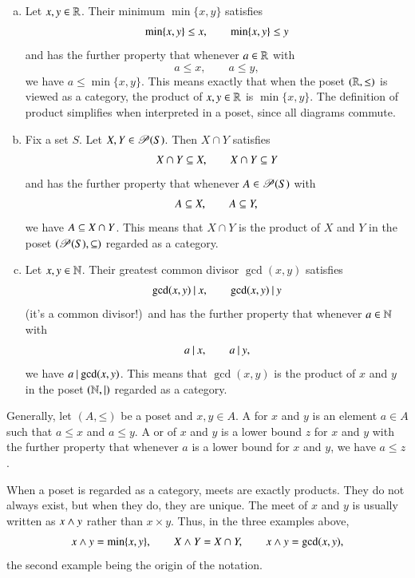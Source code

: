 \begin{examples}
\label{eg:prod-order}
%
%
\begin{enumerate}[(b)]
\item
Let $x, y \in \mathbb{R}$.  Their minimum $\min\{x, y\}$ satisfies
\[
\min\{x, y\} \leq x,
\qquad
\min\{x, y\} \leq y
%
\index{minimum}
%
\]
and has the further property that whenever $a \in \mathbb{R}$ with
\[
a \leq x,
\qquad
a \leq y,
\]
we have $a \leq \min\{x, y\}$.  This means exactly that when the poset
$(\mathbb{R}, \mathord{\leq})$ is viewed as a category, the product of $x, y
\in \mathbb{R}$ is $\min\{x, y\}$.  The definition of product simplifies when
interpreted in a poset, since all diagrams commute.

\item
Fix a set $S$.  Let $X, Y \in \operatorname{\mathscr{P}}(S)$.%
%
%
Then $X \cap Y$%
%
%
satisfies
\[
X \cap Y \subseteq X,
\qquad
X \cap Y \subseteq Y
\]
and has the further property that whenever $A \in \operatorname{\mathscr{P}}(S)$ with
\[
A \subseteq X,
\qquad
A \subseteq Y,
\]
we have $A \subseteq X \cap Y$.  This means that $X \cap Y$ is the product of
$X$ and $Y$ in the poset $(\operatorname{\mathscr{P}}(S), \mathord{\subseteq})$ regarded as a
category.

\item
Let $x, y \in \mathbb{N}$.  Their greatest%
%
%
common divisor $\gcd(x, y)$ satisfies
\[
\gcd(x, y) \mathbin{\mid} x,
\qquad
\gcd(x, y) \mathbin{\mid} y
\]
(it's a common divisor!)\ and has the further property that whenever $a \in
\mathbb{N}$ with
\[
a \mathbin{\mid} x,
\qquad
a \mathbin{\mid} y,
\]
we have $a \mathbin{\mid} \gcd(x, y)$.  This means that $\gcd(x, y)$ is the
product of $x$ and $y$ in the poset $(\mathbb{N}, \mathord{\mid})$ regarded as a
category.
\end{enumerate}

Generally, let $(A, \mathord{\leq})$ be a poset and $x, y \in A$.  A
 for $x$ and $y$ is an element $a \in A$ such that $a
\leq x$ and $a \leq y$.  A  or %
%
%
of $x$ and $y$ is a lower bound $z$ for $x$ and $y$ with the further
property that whenever $a$ is a lower bound for $x$ and $y$, we have $a
\leq z$.

When a poset is regarded as a category, meets are exactly products.  They do
not always exist, but when they do, they are unique.  The meet of $x$ and $y$
is usually written as $x \wedge y$%
%
%
rather than $x \times y$.  Thus, in the three examples above,
\[
x \wedge y = \min\{x, y\},
\qquad
X \wedge Y = X \cap Y,
\qquad
x \wedge y = \gcd(x, y),
\]
the second example being the origin of the notation.%
%
%
\end{examples}

